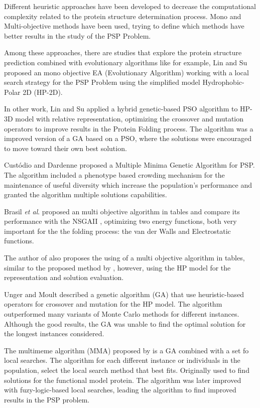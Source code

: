 Different heuristic approaches have been developed to decrease the computational complexity related to the protein structure determination process. Mono and Multi-objective methods have been used, trying to define which methods have better results in the study of the PSP Problem.


Among these approaches, there are studies that explore the protein structure prediction combined with evolutionary algorithms like for example, Lin and Su \cite{li2012genetic} proposed an mono objective EA (Evolutionary Algorithm) working with a local search strategy for the PSP Problem using the simplified model Hydrophobic-Polar 2D (HP-2D).


In other work, Lin and Su \cite{lin2011protein} applied a hybrid genetic-based PSO algorithm to HP-3D model with relative representation, optimizing the crossover and mutation operators to improve results in the Protein Folding process. The algorithm was a improved version of a GA based on a PSO, where the solutions were encouraged to move toward their own best solution.


Cust\'{o}dio and Dardenne \cite{custodio2014multiple} proposed a Multiple Minima Genetic Algorithm for PSP. The algorithm included a phenotype based crowding mechanism for the maintenance of useful diversity which increase the population's performance and granted the algorithm multiple solutions capabilities.


Brasil \textit{et al}.\cite{soares2011investigating} proposed an multi objective algorithm in tables and compare its performance with the NSGAII \cite{deb2002fast}, optimizing two energy functions, both very important for the the folding process: the van der Walls and Electrostatic functions.


The author of \cite{gabriel2012algoritmos} also proposes the using of a multi objective algorithm in tables, similar to the proposed method by \cite{soares2011investigating}, however, using the HP model for the representation and solution evaluation.

Unger and Moult \cite{} described a genetic algorithm (GA) that use heuristic-based operators for crossover and mutation for the HP model. The algorithm outperformed many variants of Monte Carlo methods for different instances. Although the good results, the GA was unable to find the optimal solution for the longest instances considered.

The multimeme algorithm (MMA) proposed by \cite{} is a GA combined with a set fo local searches. The algorithm for each different instance or individuals in the population, select the local search method that best fits. Originally used to find solutions for the functional model protein. The algorithm was later improved with fuzy-logic-based local searches, leading the algorithm to find improved results in the PSP problem.

